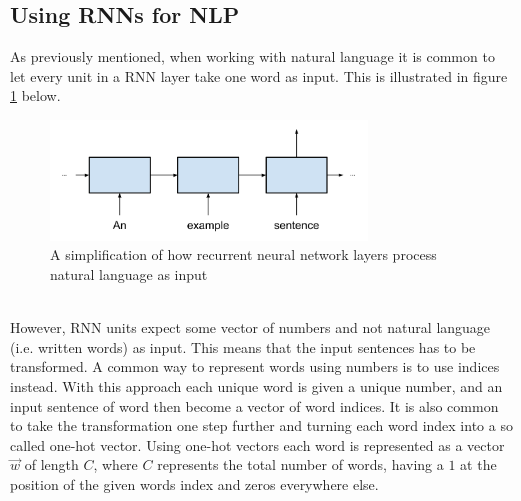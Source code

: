 \subsection{Using RNNs for NLP}\label{sec:rnn_nlp}
As previously mentioned, when working with natural language it is common to let every unit in a RNN layer take one word as input. This is illustrated in figure \ref{fig:sentence_to_rnn} below.
\begin{figure}[h]
    \centering
    \includegraphics[width=0.75\textwidth]{figure/ann/sentence_to_rnn}
    \caption{A simplification of how recurrent neural network layers process natural language as input}
    \label{fig:sentence_to_rnn}
\end{figure}
\\
However, RNN units expect some vector of numbers and not natural language (i.e. written words) as input. This means that the input sentences has to be transformed. A common way to represent words using numbers is to use indices instead. With this approach each unique word is given a unique number, and an input sentence of word then become a vector of word indices. It is also common to take the transformation one step further and turning each word index into a so called one-hot vector. Using one-hot vectors each word is represented as a vector $\vec{w}$ of length $C$, where $C$ represents the total number of words, having a $1$ at the position of the given words index and zeros everywhere else.
